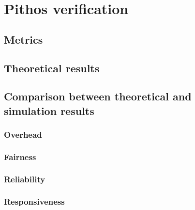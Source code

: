 \chapter{Pithos verification}
    \label{chp:VERIFICATION}


    \section{Metrics}

    \section{Theoretical results}

    \section{Comparison between theoretical and simulation results}

        \subsection{Overhead}
        \subsection{Fairness}
        \subsection{Reliability}
        \subsection{Responsiveness}